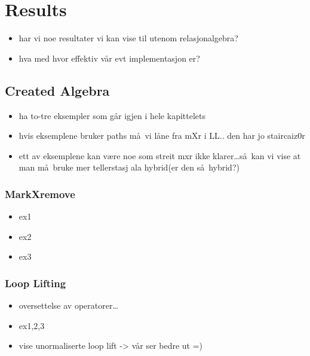 \chapter{Results}
\label{chapter:results}
\begin{itemize}
  \item har vi noe resultater vi kan vise til utenom relasjonalgebra?
  \item hva med hvor effektiv v\aa r evt implementasjon er?
\end{itemize}

\section{Created Algebra}
\begin{itemize}
  \item ha to-tre eksempler som g\aa r igjen i hele kapittelets
  \item hvis eksemplene bruker paths m\aa~vi l\aa ne fra mXr i LL.. den har jo staircaiz0r
  \item ett av eksemplene kan v\ae re noe som streit mxr ikke klarer\ldots s\aa~kan vi vise at man m\aa~bruke mer
  tellerstasj ala hybrid(er den s\aa~hybrid?)
\end{itemize}

\subsection{MarkXremove}
\label{sect:results:createMxR}
\begin{itemize}
  \item ex1
  \item ex2
  \item ex3
\end{itemize}

\subsection{Loop Lifting}
\label{sect:results:createLL}
\begin{itemize}
  \item oversettelse av operatorer\ldots
  \item ex1,2,3
  \item vise unormaliserte loop lift -> v\aa r ser bedre ut =) 
\end{itemize}







